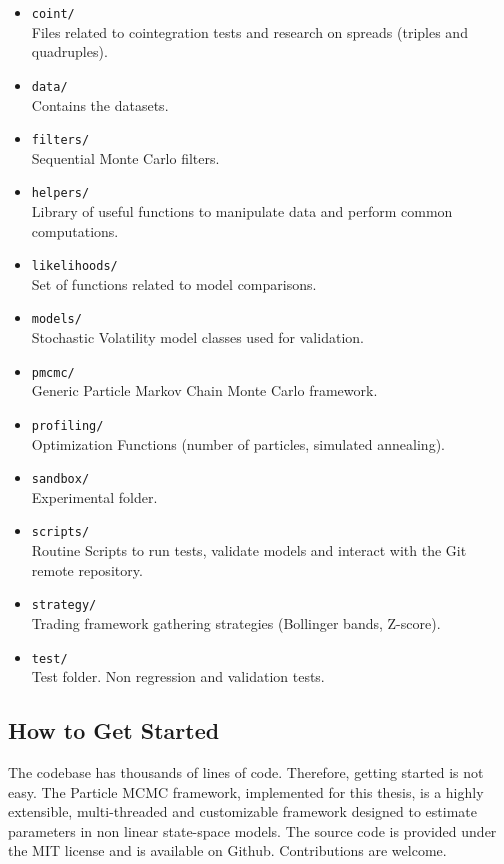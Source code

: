 \documentclass[11pt,a4,twosided,singlespacing,titlepagenumber=on]{scrreprt}
\numberwithin{equation}{chapter} %
\theoremstyle{remark}
\begin{document}
\begin{itemize}
\item \texttt{coint/} \\
Files related to cointegration tests and research on spreads (triples and quadruples).
\item \texttt{data/} \\
Contains the datasets.
\item \texttt{filters/} \\
Sequential Monte Carlo filters.
\item \texttt{helpers/} \\
Library of useful functions to manipulate data and perform common computations.
\item \texttt{likelihoods/} \\
Set of functions related to model comparisons.
\item \texttt{models/} \\
Stochastic Volatility model classes used for validation.
\item \texttt{pmcmc/} \\
Generic Particle Markov Chain Monte Carlo framework.
\item \texttt{profiling/} \\
Optimization Functions (number of particles, simulated annealing).
\item \texttt{sandbox/} \\
Experimental folder.
\item \texttt{scripts/} \\
Routine Scripts to run tests, validate models and interact with the Git remote repository.
\item \texttt{strategy/} \\
Trading framework gathering strategies (Bollinger bands, Z-score).
\item \texttt{test/} \\
Test folder. Non regression and validation tests.
\end{itemize}

\subsection{How to Get Started} 
The codebase has thousands of lines of code. Therefore, getting started is not easy.
The Particle MCMC framework, implemented for this thesis, is a highly extensible, multi-threaded and customizable framework designed to estimate parameters in non linear state-space models. The source code is provided under the MIT license and is available on Github. Contributions are welcome. \\
\end{document}
